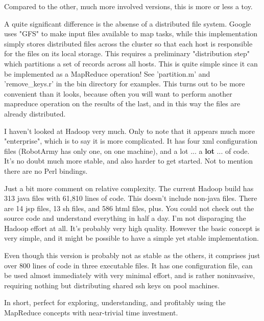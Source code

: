 \documentclass{tufte-handout}
\begin{document}
Compared to the other, much more involved versions, this is more or less a toy.



A quite significant difference is the absense of a distributed file system. Google uses "GFS" to make input files available to map tasks, while this implementation simply stores distributed files across the cluster so that each host is responsible for the files on its local storage. This requires a preliminary "distribution step" which partitions a set of records across all hosts. This is quite simple since it can be implemented as a MapReduce operation! See 'partition.m' and 'remove\_keys.r' in the bin directory for examples. This turns out to be more convenient than it looks, because often you will want to perform another mapreduce operation on the results of the last, and in this way the files are already distributed.



I haven't looked at Hadoop very much. Only to note that it appears much more "enterprise", which is to say it is more complicated. It has four xml configuration files (RobotArmy has only one, on one machine), and a lot ... a \textbf{lot} ... of code. It's no doubt much more stable, and also harder to get started. Not to mention there are no Perl bindings.



Just a bit more comment on relative complexity. The current Hadoop build has 313 java files with 61,810 lines of code. This doesn't include non-java files. There are 14 jsp files, 13 sh files, and 586 html files, plus. You could not check out the source code and understand everything in half a day. I'm not disparaging the Hadoop effort at all. It's probably very high quality. However the basic concept is very simple, and it might be possible to have a simple yet stable implementation.



Even though this version is probably not as stable as the others, it comprises just over 800 lines of code in three executable files. It has one configuration file, can be used almost immediately with very minimal effort, and is rather noninvasive, requiring nothing but distributing shared ssh keys on pool machines.



In short, perfect for exploring, understanding, and profitably using the MapReduce concepts with near-trivial time investment.
\end{document}
